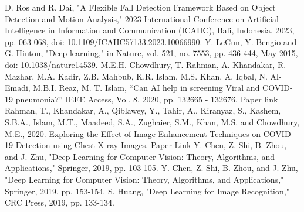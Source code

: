 \documentclass[conference]{IEEEtran}
\begin{document}
\begin{thebibliography}{00}
 D. Ros and R. Dai, "A Flexible Fall Detection Framework Based on Object Detection and Motion Analysis," 2023 International Conference on Artificial Intelligence in Information and Communication (ICAIIC), Bali, Indonesia, 2023, pp. 063-068, doi: 10.1109/ICAIIC57133.2023.10066990.
 Y. LeCun, Y. Bengio and G. Hinton, "Deep learning," in Nature, vol. 521, no. 7553, pp. 436-444, May 2015, doi: 10.1038/nature14539.
 M.E.H. Chowdhury, T. Rahman, A. Khandakar, R. Mazhar, M.A. Kadir, Z.B. Mahbub, K.R. Islam, M.S. Khan, A. Iqbal, N. Al-Emadi, M.B.I. Reaz, M. T. Islam, “Can AI help in screening Viral and COVID-19 pneumonia?” IEEE Access, Vol. 8, 2020, pp. 132665 - 132676. Paper link
 Rahman, T., Khandakar, A., Qiblawey, Y., Tahir, A., Kiranyaz, S., Kashem, S.B.A., Islam, M.T., Maadeed, S.A., Zughaier, S.M., Khan, M.S. and Chowdhury, M.E., 2020. Exploring the Effect of Image Enhancement Techniques on COVID-19 Detection using Chest X-ray Images. Paper Link
 Y. Chen, Z. Shi, B. Zhou, and J. Zhu, "Deep Learning for Computer Vision: Theory, Algorithms, and Applications," Springer, 2019, pp. 103-105.
 Y. Chen, Z. Shi, B. Zhou, and J. Zhu, "Deep Learning for Computer Vision: Theory, Algorithms, and Applications," Springer, 2019, pp. 153-154.
 S. Huang, "Deep Learning for Image Recognition," CRC Press, 2019, pp. 133-134.
\end{thebibliography}
\end{document}
